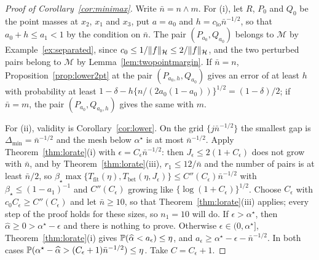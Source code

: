 \begin{proof}[Proof of Corollary~\ref{cor:minimax}]
Write $\bar n=n\wedge m$. For (i), let $R$, $P_0$ and $Q_0$ be the point masses at $x_2$, $x_1$ and $x_3$, put $a=a_0$ and
$h=c_{\mathrm{lo}}\bar n^{-1/2}$, so that $a_0+h\le a_1<1$ by the condition on $\bar n$. The pair $(P_{a_0},Q_{a_0})$ belongs to
$\mathcal M$ by Example~\ref{ex:separated}, since $c_0\le1/\|f\|_{\mathcal{H}}\le2/\|f\|_{\mathcal{H}}$, and the two perturbed pairs belong
to $\mathcal M$ by Lemma~\ref{lem:twopointmargin}. If $\bar n=n$, Proposition~\ref{prop:lower2pt} at the pair
$(P_{a_0,h},Q_{a_0})$ gives an error of at least $h$ with probability at least
$1-\delta-h\{n/(2a_0(1-a_0))\}^{1/2}=(1-\delta)/2$; if $\bar n=m$, the pair $(P_{a_0},Q_{a_0,h})$ gives the same with $m$.

For (ii), validity is Corollary~\ref{cor:lower}. On the grid $\{j\bar n^{-1/2}\}$ the smallest gap is $\Delta_{\min}=\bar n^{-1/2}$ and
the mesh below $\alpha^\star$ is at most $\bar n^{-1/2}$. Apply Theorem~\ref{thm:lorate}(i) with $\epsilon=C_\epsilon
\bar n^{-1/2}$: then $J_\epsilon\le2(1+C_\epsilon)$ does not grow with $\bar n$, and by Theorem~\ref{thm:lorate}(iii),
$r_1\le12/\bar n$ and the number of pairs is at least $\bar n/2$, so $\beta_\star\max\{T_{\mathrm{fit}}(\eta),
T_{\mathrm{bet}}(\eta,J_\epsilon)\}\le C''(C_\epsilon)\bar n^{-1/2}$ with $\beta_\star\le(1-a_1)^{-1}$ and $C''(C_\epsilon)$
growing like $\{\log(1+C_\epsilon)\}^{1/2}$. Choose $C_\epsilon$ with $c_0C_\epsilon\ge C''(C_\epsilon)$ and let
$\bar n\ge10$, so that Theorem~\ref{thm:lorate}(iii) applies; every step of the proof holds for these sizes, so $n_1=10$
will do. If $\epsilon>\alpha^\star$, then $\widehat\alpha\ge0>\alpha^\star
-\epsilon$ and there is nothing to prove. Otherwise $\epsilon\in(0,\alpha^\star]$, Theorem~\ref{thm:lorate}(i) gives
$\mathbb{P}(\widehat\alpha<a_\epsilon)\le\eta$, and $a_\epsilon\ge\alpha^\star-\epsilon-\bar n^{-1/2}$. In both
cases $\mathbb{P}(\alpha^\star-\widehat\alpha>(C_\epsilon+1)\bar n^{-1/2})\le\eta$. Take $C=C_\epsilon+1$.
\end{proof}
